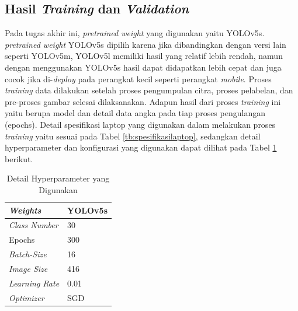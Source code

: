 \subsection{Hasil \textit{Training} dan \textit{Validation}}
\label{subsec:hasiltrainvaldata}

Pada tugas akhir ini, \textit{pretrained weight} yang digunakan yaitu YOLOv5s. \textit{pretrained weight} YOLOv5s dipilih karena jika dibandingkan dengan versi lain seperti YOLOv5m, YOLOv5l memiliki hasil yang relatif lebih rendah, namun dengan menggunakan YOLOv5s hasil dapat didapatkan lebih cepat dan juga cocok jika di-\textit{deploy} pada perangkat kecil seperti perangkat \textit{mobile}. Proses \textit{training} data dilakukan setelah proses pengumpulan citra, proses pelabelan, dan pre-proses gambar selesai dilaksanakan. Adapun hasil dari proses \textit{training} ini yaitu berupa model dan detail data angka pada tiap proses pengulangan  (epochs). Detail spesifikasi laptop yang digunakan dalam melakukan proses \textit{training} yaitu sesuai pada Tabel \ref{tb:spesifikasilaptop}, sedangkan detail hyperparameter dan konfigurasi yang digunakan dapat dilihat pada Tabel \ref*{tb:parametertrain} berikut. \par 

\begin{table}[H]
  \caption{Detail Hyperparameter yang Digunakan}
  \label{tb:parametertrain}
  \begin{center}
    \begin{tabularx}{0.5\textwidth}{|X<{\centering}|X<{\centering}|}
      \hline
      \textit{Weights}                         & YOLOv5s                 \\ \hline
      \textit{Class Number}                    & 30                      \\ \hline
      Epochs                                   & 300                      \\ \hline
      \textit{Batch-Size}                      & 16                      \\ \hline
      \textit{Image Size}                      & 416                     \\ \hline
      \textit{Learning Rate}                   & 0.01                    \\ \hline
      \textit{Optimizer}                       & SGD                     \\ \hline
    \end{tabularx}
  \end{center}  
\end{table}


